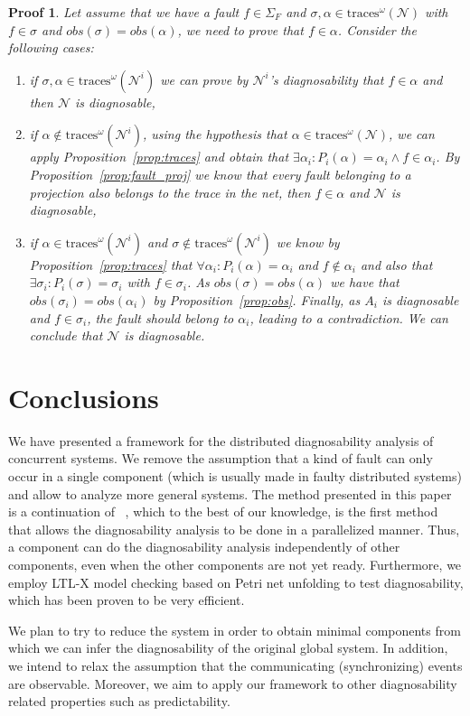 \documentclass[a4paper]{article}
\newcommand{\obs}[1]{obs(#1)}
\newcommand{\proj}[2]{P_{#1}({#2})}
\newcommand\netn{{\mathcal{N}}}
\newtheorem{pf}{Proof}
\newcommand{\inftraces}[1]{\mathrm{traces}^{\omega}(#1)}
\begin{document}
\begin{pf}
  Let assume that we have a fault $f \in \Sigma_F$ and $\sigma, \alpha \in \inftraces \netn$ with $f \in \sigma$ and $\obs \sigma = \obs \alpha$, we need to prove that $f \in \alpha$. Consider the following cases: 
  \begin{enumerate}
    \item if $\sigma, \alpha \in \inftraces{\netn^i}$ we can prove by $\netn^i$'s diagnosability that $f \in \alpha$ and then $\netn$ is diagnosable,
    \item if $\alpha \not \in \inftraces{\netn^i}$, using the hypothesis that $\alpha \in \inftraces \netn$, we can apply Proposition~\ref{prop:traces} and obtain that $\exists \alpha_i: \proj i \alpha = \alpha_i \land f \in \alpha_i$. By Proposition~\ref{prop:fault_proj} we know that every fault belonging to a projection also belongs to the trace in the net, then $f \in \alpha$ and $\netn$ is diagnosable,
    \item if $\alpha \in \inftraces{\netn^i}$ and $\sigma \not \in \inftraces{\netn^i}$ we know by Proposition~\ref{prop:traces} that $\forall \alpha_i: \proj i \alpha = \alpha_i$ and $f \not \in \alpha_i$ and also that $\exists \sigma_i : \proj i \sigma = \sigma_i$ with $f \in \sigma_i$. As $\obs \sigma = \obs \alpha$ we have that $\obs{\sigma_i} = \obs{\alpha_i}$ by Proposition~\ref{prop:obs}. Finally, as $A_i$ is diagnosable and $f \in \sigma_i$, the fault should belong to $\alpha_i$, leading to a contradiction. We can conclude that $\netn$ is diagnosable.
  \end{enumerate}
\end{pf}

\section{Conclusions} \label{sec:CFW}

We have presented a framework for the distributed diagnosability analysis of concurrent systems. We remove the assumption that a kind of fault can only occur in a single component (which is usually made in faulty distributed systems) and allow to analyze more general systems. The method presented in this paper is a continuation of ~\cite{par_diag}, which to the best of our knowledge, is the first method that allows the diagnosability analysis to be done in a parallelized manner. Thus, a component can do the diagnosability analysis independently of other components, even when the other components are not yet ready. Furthermore, we employ LTL-X model checking based on Petri net unfolding to test diagnosability, which has been proven to be very efficient.

We plan to try to reduce the system in order to obtain minimal components from which we can infer the diagnosability of the original global system. In addition, we intend to relax the assumption that the communicating (synchronizing) events are observable. Moreover, we aim to apply our framework to other diagnosability related properties such as predictability.



\end{document}
